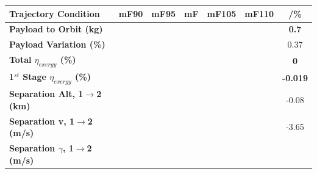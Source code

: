 \begin{table}
\begin{tabular}{l c c c c c c} 
	\hline \textbf{Trajectory Condition}
	&mF90
	&mF95
	&mF
	&mF105
	&mF110
	& /\%
	\\
	\hline \textbf{Payload to Orbit (kg)}
	& \textbf{\PayloadToOrbitmFuelNinetyNoReturn}
	& \textbf{\PayloadToOrbitmFuelNinetyFiveNoReturn}
	& \textbf{\PayloadToOrbitmFuelStandardNoReturn}
	& \textbf{\PayloadToOrbitmFuelOneHundredFiveNoReturn}
	& \textbf{\PayloadToOrbitmFuelOneHundredTenNoReturn}
	&\textbf{0.7}
	\\
	\textbf{Payload Variation (\%)}
	& \PayloadVarmFuelNinetyNoReturn
	& \PayloadVarmFuelNinetyFiveNoReturn
	& \PayloadVarmFuelStandardNoReturn
	& \PayloadVarmFuelOneHundredFiveNoReturn
	& \PayloadVarmFuelOneHundredTenNoReturn
	&0.37
	\\
	\textbf{Total $\eta_{exergy}$ (\%)}
	& \textbf{\totalExergyEffmFuelNinetyNoReturn}
	& \textbf{\totalExergyEffmFuelNinetyFiveNoReturn}
	& \textbf{\totalExergyEffmFuelStandardNoReturn}
	& \textbf{\totalExergyEffmFuelOneHundredFiveNoReturn}
	& \textbf{\totalExergyEffmFuelOneHundredTenNoReturn}
	& \textbf{0}
	\\
	\hline 
	\textbf{1$^{st}$ Stage $\eta_{exergy}$ (\%)}
	& \textbf{\firstExergyEffmFuelNinetyNoReturn}
	& \textbf{\firstExergyEffmFuelNinetyFiveNoReturn}
	& \textbf{\firstExergyEffmFuelStandardNoReturn}
	& \textbf{\firstExergyEffmFuelOneHundredFiveNoReturn}
	& \textbf{\firstExergyEffmFuelOneHundredTenNoReturn}
	& \textbf{-0.019}
	\\
	\textbf{Separation Alt, 1$\rightarrow$2 (km)}
	& \firstsecondSeparationAltmFuelNinetyNoReturn
	& \firstsecondSeparationAltmFuelNinetyFiveNoReturn
	& \firstsecondSeparationAltmFuelStandardNoReturn
	& \firstsecondSeparationAltmFuelOneHundredFiveNoReturn
	& \firstsecondSeparationAltmFuelOneHundredTenNoReturn
	&-0.08
	\\
	\textbf{Separation v, 1$\rightarrow$2 (m/s)}
	& \firstsecondSeparationvmFuelNinetyNoReturn
	& \firstsecondSeparationvmFuelNinetyFiveNoReturn
	& \firstsecondSeparationvmFuelStandardNoReturn
	& \firstsecondSeparationvmFuelOneHundredFiveNoReturn
	& \firstsecondSeparationvmFuelOneHundredTenNoReturn
	&-3.65
	\\
	\textbf{Separation $\gamma$, 1$\rightarrow$2 (m/s)}
	& \firstsecondSeparationgammamFuelNinetyNoReturn
	& \firstsecondSeparationgammamFuelNinetyFiveNoReturn
	& \firstsecondSeparationgammamFuelStandardNoReturn
	& \firstsecondSeparationgammamFuelOneHundredFiveNoReturn
	& \firstsecondSeparationgammamFuelOneHundredTenNoReturn

\end{tabular}
\end{table}
